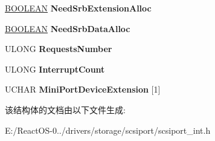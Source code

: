 \begin{DoxyCompactItemize}
\hyperlink{_processor_bind_8h_a112e3146cb38b6ee95e64d85842e380a}{B\+O\+O\+L\+E\+AN} {\bfseries Need\+Srb\+Extension\+Alloc}
\item 
\mbox{\label{struct___s_c_s_i___p_o_r_t___d_e_v_i_c_e___e_x_t_e_n_s_i_o_n_abc1f47d6cc8aa04231ef2bebeba12301}} 
\hyperlink{_processor_bind_8h_a112e3146cb38b6ee95e64d85842e380a}{B\+O\+O\+L\+E\+AN} {\bfseries Need\+Srb\+Data\+Alloc}
\item 
\mbox{\label{struct___s_c_s_i___p_o_r_t___d_e_v_i_c_e___e_x_t_e_n_s_i_o_n_a16c805180b90766a4f28265822a206df}} 
U\+L\+O\+NG {\bfseries Requests\+Number}
\item 
\mbox{\label{struct___s_c_s_i___p_o_r_t___d_e_v_i_c_e___e_x_t_e_n_s_i_o_n_a2961bef23253d4cb15363862c11a0fbf}} 
U\+L\+O\+NG {\bfseries Interrupt\+Count}
\item 
\mbox{\label{struct___s_c_s_i___p_o_r_t___d_e_v_i_c_e___e_x_t_e_n_s_i_o_n_af81ba127aa991a9d44a69657ab893d41}} 
U\+C\+H\+AR {\bfseries Mini\+Port\+Device\+Extension} \mbox{[}1\mbox{]}
\end{DoxyCompactItemize}


该结构体的文档由以下文件生成\+:\begin{DoxyCompactItemize}
\item 
E\+:/\+React\+O\+S-\/0../drivers/storage/scsiport/scsiport\+\_\+int.\+h\end{DoxyCompactItemize}
